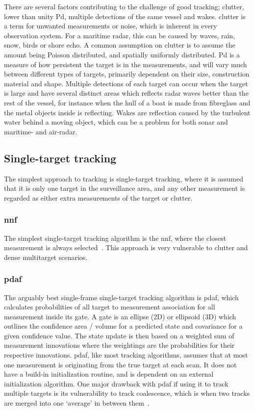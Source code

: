 There are several factors contributing to the challenge of good tracking; \gls{clutter}, lower than unity \gls{Pd}, multiple detections of the same vessel and wakes. \Gls{clutter} is a term for unwanted measurements or noise, which is inherent in every observation system. For a maritime radar, this can be caused by waves, rain, snow, birds or shore echo. A common assumption on clutter is to assume the amount being Poisson distributed, and spatially uniformly distributed. \gls{Pd} is a measure of how persistent the target is in the measurements, and will vary much between different types of targets, primarily dependent on their size, construction material and shape. Multiple detections of each target can occur when the target is large and have several distinct areas which reflects radar waves better than the rest of the vessel, for instance when the hull of a boat is made from fibreglass and the metal objects inside is reflecting. Wakes are reflection caused by the turbulent water behind a moving object, which can be a problem for both sonar and maritime- and air-radar.

\subsection{Single-target tracking}
The simplest approach to tracking is single-target tracking, where it is assumed that it is only one target in the surveillance area, and any other measurement is regarded as either extra measurements of the target or \gls{clutter}. 

\subsubsection*{\gls{nnf}}
The simplest single-target tracking algorithm is the \gls{nnf}, where the closest measurement is always selected~\cite{Bar-Shalom1998}. This approach is very vulnerable to clutter and dense multitarget scenarios.%

\subsubsection*{\gls{pdaf}}
The arguably best single-frame single-target tracking algorithm is \gls{pdaf}, which calculates probabilities of all target to measurement association for all measurement inside its gate. A gate is an ellipse (2D) or ellipsoid (3D) which outlines the confidence area / volume for a predicted state and covariance for a given confidence value. The state update is then based on a weighted sum of measurement innovations where the weightings are the probabilities for their respective innovations. \gls{pdaf}, like most tracking algorithms, assumes that at most one measurement is originating from the true target at each scan. It does not have a build-in initialization routine, and is dependent on an external initialization algorithm. One major drawback with \gls{pdaf} if using it to track multiple targets is its vulnerability to track \gls{coalescence}, which is when two tracks are merged into one `average' in between them~\cite{Blom2000}.

